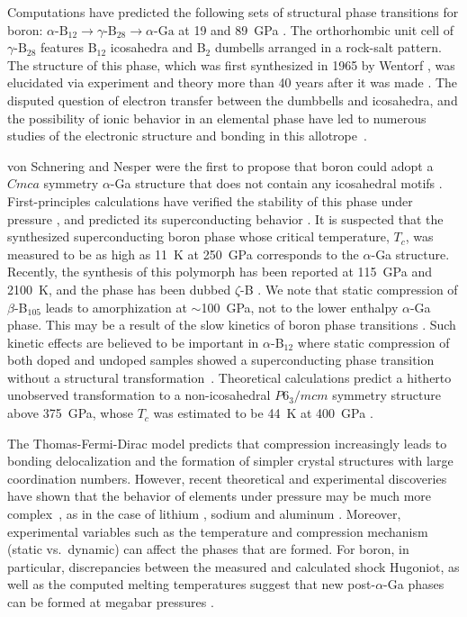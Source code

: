\documentclass[reprint,aps,prl,twocolumn,letterpaper]{revtex4-2}
\begin{document}
Computations have predicted the following sets of structural phase transitions for boron: $\alpha\text{-B}_{12}\rightarrow \gamma\text{-B}_{28}\rightarrow\alpha\text{-Ga}$ at 19 and 89~GPa \cite{Oganov:2009}. The orthorhombic unit cell of $\gamma\text{-B}_{28}$ features B$_{12}$ icosahedra and B$_2$ dumbells arranged in a rock-salt pattern. The structure of this phase, which was first synthesized in 1965 by Wentorf \cite{Wentorf:1965}, was elucidated via experiment and theory more than 40 years after it was made \cite{Zarechnaya:2008,Oganov:2009}. The disputed question of electron transfer between the dumbbells and icosahedra, and the possibility of ionic behavior in an elemental phase have led to numerous studies of the electronic structure and bonding in this allotrope~\cite{Oganov:2009, Simak:2009, Haussermann:2010,Mondal:2011}. 

von Schnering and Nesper were the first to propose that boron could adopt a $Cmca$ symmetry $\alpha$-Ga structure that does not contain any icosahedral motifs \cite{vonSchnering:1991}. First-principles calculations have verified the stability of this phase under pressure \cite{Haussermann:2003,Segall:2003}, and predicted its superconducting behavior \cite{Ma:2004}. It is suspected that the synthesized superconducting boron phase whose critical temperature, $T_c$, was measured to be as high as 11~K at 250~GPa \cite{Eremets:2001} corresponds to the $\alpha$-Ga structure. Recently, the synthesis of this polymorph has been reported at 115~GPa and 2100~K, and the phase has been dubbed $\zeta$-B \cite{Chuvashova:2017}. We note that static compression of $\beta$-B$_{105}$ leads to amorphization at $\sim$100~GPa, not to the lower enthalpy $\alpha$-Ga phase. This may be a result of the slow kinetics of boron phase transitions \cite{Sanz:2002}. Such kinetic effects are believed to be important in $\alpha$-B$_{12}$ where static compression of both doped and undoped samples showed a superconducting phase transition without a structural transformation~\cite{Shirai:2009,Shirai:2011,Nagatochi:2011}. Theoretical calculations predict a hitherto unobserved transformation to a non-icosahedral $P6_3/mcm$ symmetry structure above 375~GPa, whose $T_c$ was estimated to be 44~K at 400~GPa \cite{Li:2014a}. 

The Thomas-Fermi-Dirac model predicts that compression increasingly leads to bonding delocalization and the formation of simpler crystal structures with large coordination numbers. However, recent theoretical and experimental discoveries have shown that the behavior of elements under pressure may be much more complex~\cite{Zurek:2019k}, as in the case of lithium \cite{Nelmes:2011a,Tsuppayakorn-aek:2018}, sodium \cite{Gregoryanz:2008a,Ma:2009a} and aluminum \cite{Pickard:2010a}. Moreover, experimental variables such as the temperature and compression mechanism (static vs.\ dynamic) can affect the phases that are formed. For boron, in particular, discrepancies between the measured and calculated shock Hugoniot, as well as the computed melting temperatures suggest that new post-$\alpha$-Ga phases can be formed at megabar pressures \cite{ZhangShuai:2020}. 
\end{document}
